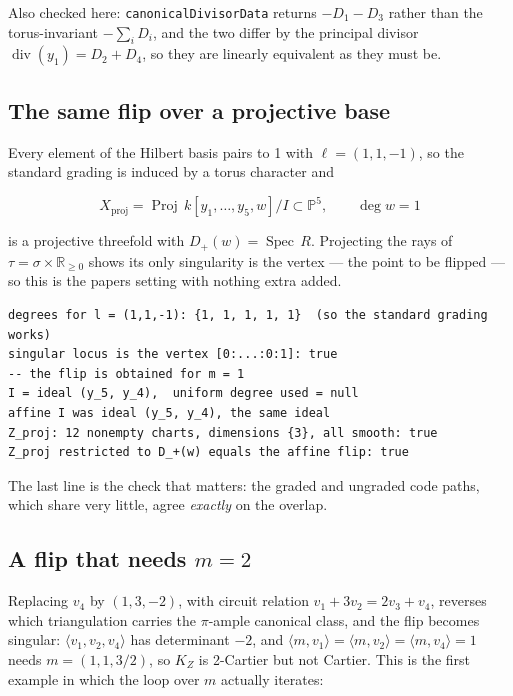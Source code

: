 \documentclass[11pt,reqno]{amsart}
\newcommand{\PP}{\ensuremath{\mathbb{P}}}
\newcommand{\RR}{\ensuremath{\mathbb{R}}}
\DeclareMathOperator{\Proj}{Proj}
\DeclareMathOperator{\Spec}{Spec}
\DeclareMathOperator{\divisor}{div}
\theoremstyle{plain}
\theoremstyle{definition}
\begin{document}
Also checked here: \texttt{canonicalDivisorData} returns \(-D_1 - D_3\)
rather than the torus-invariant \(-\sum_i D_i\), and the two differ by
the principal divisor \(\divisor(y_1) = D_2 + D_4\), so they are
linearly equivalent as they must be.

\subsection{The same flip over a projective
base}\label{the-same-flip-over-a-projective-base}

Every element of the Hilbert basis pairs to 1 with \(\ell = (1,1,-1)\),
so the standard grading is induced by a torus character and

\[X_{\mathrm{proj}} = \Proj\, k[y_1,\dots,y_5,w]/I \subset \PP^5,
\qquad \deg w = 1\]

is a projective threefold with \(D_+(w) = \Spec\, R\).
Projecting the rays of \(\tau = \sigma \times \RR_{\geq 0}\) shows its
only singularity is the vertex --- the point to be flipped --- so this
is the paper\textquotesingle s setting with nothing extra added.

\begin{verbatim}
degrees for l = (1,1,-1): {1, 1, 1, 1, 1}  (so the standard grading works)
singular locus is the vertex [0:...:0:1]: true
-- the flip is obtained for m = 1
I = ideal (y_5, y_4),  uniform degree used = null
affine I was ideal (y_5, y_4), the same ideal
Z_proj: 12 nonempty charts, dimensions {3}, all smooth: true
Z_proj restricted to D_+(w) equals the affine flip: true
\end{verbatim}

The last line is the check that matters: the graded and ungraded code
paths, which share very little, agree \emph{exactly} on the overlap.

\subsection{\texorpdfstring{A flip that needs
\(m = 2\)}{A flip that needs m = 2}}\label{a-flip-that-needs-m--2}

Replacing \(v_4\) by \((1,3,-2)\), with circuit relation
\(v_1 + 3v_2 = 2v_3 + v_4\), reverses which triangulation carries the
\(\pi\)-ample canonical class, and the flip becomes singular:
\(\langle v_1,v_2,v_4\rangle\) has determinant \(-2\), and
\(\langle m, v_1\rangle = \langle m, v_2\rangle = \langle m, v_4\rangle = 1\)
needs \(m = (1,1,3/2)\), so \(K_Z\) is 2-Cartier but not Cartier. This
is the first example in which the loop over \(m\) actually iterates:
\end{document}
